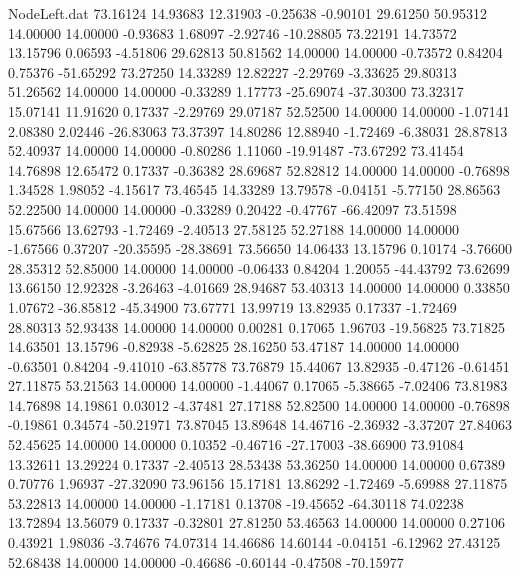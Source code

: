 \begin{filecontents}{NodeLeft.dat}
  73.16124   14.93683   12.31903    -0.25638   -0.90101   29.61250   50.95312   14.00000   14.00000   -0.93683    1.68097   -2.92746  -10.28805
  73.22191   14.73572   13.15796     0.06593   -4.51806   29.62813   50.81562   14.00000   14.00000   -0.73572    0.84204    0.75376  -51.65292
  73.27250   14.33289   12.82227    -2.29769   -3.33625   29.80313   51.26562   14.00000   14.00000   -0.33289    1.17773  -25.69074  -37.30300
  73.32317   15.07141   11.91620     0.17337   -2.29769   29.07187   52.52500   14.00000   14.00000   -1.07141    2.08380    2.02446  -26.83063
  73.37397   14.80286   12.88940    -1.72469   -6.38031   28.87813   52.40937   14.00000   14.00000   -0.80286    1.11060  -19.91487  -73.67292
  73.41454   14.76898   12.65472     0.17337   -0.36382   28.69687   52.82812   14.00000   14.00000   -0.76898    1.34528    1.98052   -4.15617
  73.46545   14.33289   13.79578    -0.04151   -5.77150   28.86563   52.22500   14.00000   14.00000   -0.33289    0.20422   -0.47767  -66.42097
  73.51598   15.67566   13.62793    -1.72469   -2.40513   27.58125   52.27188   14.00000   14.00000   -1.67566    0.37207  -20.35595  -28.38691
  73.56650   14.06433   13.15796     0.10174   -3.76600   28.35312   52.85000   14.00000   14.00000   -0.06433    0.84204    1.20055  -44.43792
  73.62699   13.66150   12.92328    -3.26463   -4.01669   28.94687   53.40313   14.00000   14.00000    0.33850    1.07672  -36.85812  -45.34900
  73.67771   13.99719   13.82935     0.17337   -1.72469   28.80313   52.93438   14.00000   14.00000    0.00281    0.17065    1.96703  -19.56825
  73.71825   14.63501   13.15796    -0.82938   -5.62825   28.16250   53.47187   14.00000   14.00000   -0.63501    0.84204   -9.41010  -63.85778
  73.76879   15.44067   13.82935    -0.47126   -0.61451   27.11875   53.21563   14.00000   14.00000   -1.44067    0.17065   -5.38665   -7.02406
  73.81983   14.76898   14.19861     0.03012   -4.37481   27.17188   52.82500   14.00000   14.00000   -0.76898   -0.19861    0.34574  -50.21971
  73.87045   13.89648   14.46716    -2.36932   -3.37207   27.84063   52.45625   14.00000   14.00000    0.10352   -0.46716  -27.17003  -38.66900
  73.91084   13.32611   13.29224     0.17337   -2.40513   28.53438   53.36250   14.00000   14.00000    0.67389    0.70776    1.96937  -27.32090
  73.96156   15.17181   13.86292    -1.72469   -5.69988   27.11875   53.22813   14.00000   14.00000   -1.17181    0.13708  -19.45652  -64.30118
  74.02238   13.72894   13.56079     0.17337   -0.32801   27.81250   53.46563   14.00000   14.00000    0.27106    0.43921    1.98036   -3.74676
  74.07314   14.46686   14.60144    -0.04151   -6.12962   27.43125   52.68438   14.00000   14.00000   -0.46686   -0.60144   -0.47508  -70.15977

\end{filecontents}
